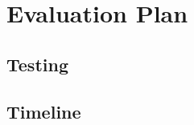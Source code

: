 \chapter{Evaluation Plan} \label{chapter:evaluation-plan}

\section{Testing}

\section{Timeline}



